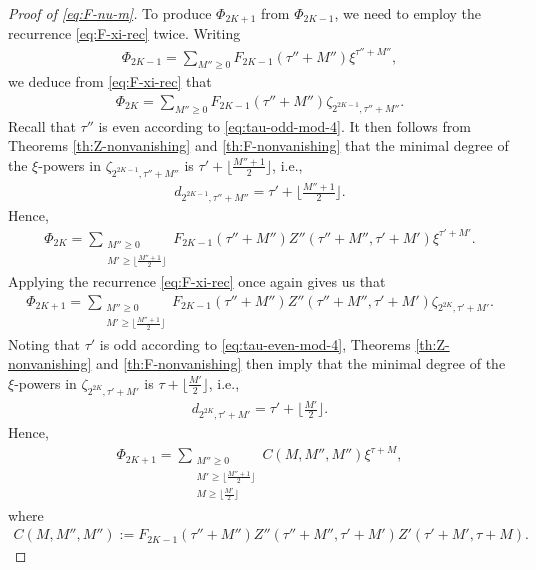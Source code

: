 \documentclass[10pt,a4paper]{amsart}
\begin{document}
\begin{proof}[Proof of \eqref{eq:F-nu-m}]
	To produce $\Phi_{2K+1}$ from $\Phi_{2K-1}$, we need to employ the recurrence \eqref{eq:F-xi-rec} twice. Writing
	\begin{align*}
		\Phi_{2K-1} = \sum_{M''\ge 0} F_{2K-1}(\tau'' + M'')\xi^{\tau''+M''},
	\end{align*}
	we deduce from \eqref{eq:F-xi-rec} that
	\begin{align*}
		\Phi_{2K} = \sum_{M''\ge 0} F_{2K-1}(\tau'' + M'')\zeta_{2^{2K-1},\tau'' + M''}.
	\end{align*}
	Recall that $\tau''$ is even according to \eqref{eq:tau-odd-mod-4}. It then follows from Theorems \ref{th:Z-nonvanishing} and \ref{th:F-nonvanishing} that the minimal degree of the $\xi$-powers in $\zeta_{2^{2K-1},\tau'' + M''}$ is $\tau'+\lfloor\tfrac{M''+1}{2}\rfloor$, i.e.,
	\begin{align}\label{eq:d-tau-2}
		d_{2^{2K-1},\tau'' + M''} = \tau'+\lfloor\tfrac{M''+1}{2}\rfloor.
	\end{align}
	Hence,
	\begin{align*}
		\Phi_{2K} = \sum_{\substack{M''\ge 0\\M'\ge \lfloor\frac{M''+1}{2}\rfloor}} F_{2K-1}(\tau'' + M'')Z''(\tau'' + M'',\tau'+M')\xi^{\tau'+M'}.
	\end{align*}
	Applying the recurrence \eqref{eq:F-xi-rec} once again gives us that
	\begin{align*}
		\Phi_{2K+1} = \sum_{\substack{M''\ge 0\\M'\ge \lfloor\frac{M''+1}{2}\rfloor}} F_{2K-1}(\tau'' + M'')Z''(\tau'' + M'',\tau'+M')\zeta_{2^{2K},\tau' + M'}.
	\end{align*}
	Noting that $\tau'$ is odd according to \eqref{eq:tau-even-mod-4}, Theorems \ref{th:Z-nonvanishing} and \ref{th:F-nonvanishing} then imply that the minimal degree of the $\xi$-powers in $\zeta_{2^{2K},\tau' + M'}$ is $\tau+\lfloor\tfrac{M'}{2}\rfloor$, i.e.,
	\begin{align}\label{eq:d-tau-1}
		d_{2^{2K},\tau' + M'} = \tau'+\lfloor\tfrac{M'}{2}\rfloor.
	\end{align}
	Hence,
	\begin{align*}
		\Phi_{2K+1} = \sum_{\substack{M''\ge 0\\M'\ge \lfloor\frac{M''+1}{2}\rfloor\\M\ge \lfloor\frac{M'}{2}\rfloor}} C(M,M'',M'') \xi^{\tau+M},
	\end{align*}
	where
	\begin{align*}
		C(M,M'',M''):=F_{2K-1}(\tau'' + M'')Z''(\tau'' + M'',\tau'+M')Z'(\tau' + M',\tau+M).
	\end{align*}
	

\end{proof}
\end{document}
